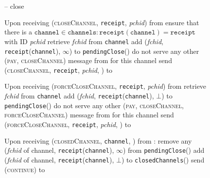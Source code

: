   \begin{figure}[H]
    \begin{systembox}{\fpaynet{} -- close}
      \begin{algorithmic}[1]
        \State Upon receiving (\textsc{closeChannel}, \texttt{receipt},
        \textit{pchid}) from \alice
        \Indent
          \State ensure that there is a $\mathtt{channel} \in \mathtt{channels}
          : \mathtt{receipt}\left(\mathtt{channel}\right) = \mathtt{receipt}$
          with ID \textit{pchid}
          \label{alg:fpaynet:close:coop:ensure}
          \State retrieve \textit{fchid} from \texttt{channel}
          \label{alg:fpaynet:close:coop:retrieve}
          \State add (\textit{fchid}, \texttt{receipt}(\texttt{channel}),
          $\infty$) to \texttt{pendingClose}(\alice)
          \label{alg:fpaynet:close:coop:mark}
          \State do not serve any other (\textsc{pay}, \textsc{closeChannel})
          message from \alice{} for this channel
          \label{alg:fpaynet:close:coop:noserve}
          \State send (\textsc{closeChannel}, \texttt{receipt}, \textit{pchid},
          \alice) to \simulator
          \label{alg:fpaynet:close:coop:send}
        \EndIndent
        \Statex

        \State Upon receiving (\textsc{forceCloseChannel}, \texttt{receipt},
        \textit{pchid}) from \alice
        \Indent
          \State retrieve \textit{fchid} from \texttt{channel}
          \label{alg:fpaynet:close:unilateral:retrieve}
          \State add (\textit{fchid}, \texttt{receipt}(\texttt{channel}),
          $\bot$) to \texttt{pendingClose}(\alice)
          \label{alg:fpaynet:close:unilateral:mark}
          \State do not serve any other (\textsc{pay}, \textsc{closeChannel},
          \textsc{forceCloseChannel}) message from \alice{} for this channel
          \label{alg:fpaynet:close:unilateral:noserve}
          \State send (\textsc{forceCloseChannel}, \texttt{receipt},
          \textit{pchid}, \alice) to \simulator
          \label{alg:fpaynet:close:unilateral:send}
        \EndIndent
        \Statex

        \State Upon receiving (\textsc{closedChannel}, \texttt{channel}, \alice)
        from \simulator:
        \Indent
          \State remove any (\textit{fchid} of channel,
          \texttt{receipt}(\texttt{channel}), $\infty$) from
          \texttt{pendingClose}(\alice)
          \State add (\textit{fchid} of channel,
          \texttt{receipt}(\texttt{channel}), $\bot$) to
          \texttt{closedChannels}(\alice)
          \label{alg:fpaynet:closedChannel:report}
          \State send (\textsc{continue}) to \simulator
        \EndIndent
        \Statex
      \end{algorithmic}
    \end{systembox}
    \caption{}
    \label{alg:fpaynet:close}
  \end{figure}

